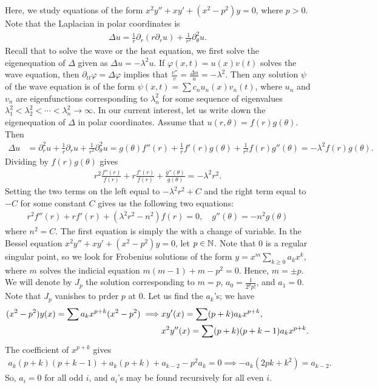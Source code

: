 Here, we study equations of the form $x^{2} y'' + xy' + (x^{2}-p^{2})y = 0$, where $p > 0$. Note that the Laplacian in polar coordinates is
\begin{align}
    \Delta u = \frac{1}{r} \partial_{r}(r \partial_{r} u) + \frac{1}{r^{2}} \partial_{\theta}^{2} u.
\end{align}
Recall that to solve the wave or the heat equation, we first solve the eigenequation of $\Delta$ given as $\Delta u = -\lambda^{2} u$. If $\varphi(x,t) = u(x) v(t)$ solves the wave equation, then $\partial_{tt} \varphi = \Delta \varphi$ implies that $\frac{v''}{v} = \frac{\Delta u}{u} = -\lambda^{2}$. Then any solution $\psi$ of the wave equation is of the form $\psi(x,t) = \sum c_{n} u_{n}(x) v_{n}(t)$, where $u_{n}$ and $v_{n}$ are eigenfunctions corresponding to $\lambda_{n}^{2}$ for some sequence of eigenvalues $\lambda_{1}^{2} < \lambda_{2}^{2} < \cdots < \lambda_{n}^{2} \to \infty$. In our current interest, let us write down the eigenequation of $\Delta$ in polar coordinates. Assume that $u(r,\theta) = f(r) g(\theta)$. Then
\begin{align}
    \Delta u &= \partial_{r}^{2} u + \frac{1}{r} \partial_{r} u + \frac{1}{r^{2}} \partial_{\theta}^{2} u = g(\theta) f''(r) + \frac{1}{r} f'(r) g(\theta) + \frac{1}{r^{2}} f(r) g''(\theta) = -\lambda^{2} f(r) g(\theta).
\end{align}
Dividing by $f(r)g(\theta)$ gives
\begin{align}
    r^{2}\frac{f''(r)}{f(r)} + r \frac{f'(r)}{f(r)} + \frac{g''(\theta)}{g(\theta)} = -\lambda^{2} r^{2}.
\end{align}
Setting the two terms on the left equal to $-\lambda^{2}r^{2}+C$ and the right term equal to $-C$ for some constant $C$ gives us the following two equations:
\begin{align}
    r^{2} f''(r) + rf'(r) + (\lambda^{2} r^{2} - n^{2}) f(r) = 0, \quad g''(\theta) = -n^{2} g(\theta)
\end{align}
where $n^{2} = C$. The first equation is simply the  with a change of variable. In the Bessel equation $x^{2} y'' + xy' + (x^{2}-p^{2})y = 0$, let $p \in \mathbb{N}$. Note that $0$ is a regular singular point, so we look for Frobenius solutions of the form $y = x^{m} \sum_{k \geq 0} a_{k} x^{k}$, where $m$ solves the indicial equation $m(m-1) + m - p^{2} = 0$. Hence, $m = \pm p$. We will denote by $J_{p}$ the solution corresponding to $m = p$, $a_{0} = \frac{1}{2^{p} p!}$, and $a_{1} = 0$. Note that $J_{p}$ vanishes to prder $p$ at $0$. Let us find the $a_{k}$'s; we have
\begin{align}
    (x^{2}-p^{2}) y(x) = \sum a_{k} x^{p+k} (x^{2}-p^{2}) \implies &x y'(x) = \sum (p+k) a_{k} x^{p+k}, \notag \\ &x^{2} y''(x) = \sum (p+k)(p+k-1) a_{k} x^{p+k}.
\end{align}
The coefficient of $x^{p+k}$ gives
\begin{align}
    a_{k}(p+k)(p+k-1) + a_{k}(p+k) + a_{k-2} - p^{2} a_{k} = 0 \implies -a_{k}(2pk+k^{2}) = a_{k-2}.
\end{align}
So, $a_{i} = 0$ for all odd $i$, and $a_{i}$'s may be found recursively for all even $i$.

